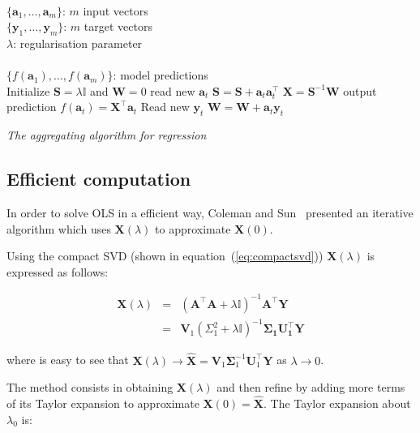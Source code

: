 \begin{algorithm}[ht]
\begin{algorithmic}[1]
\REQUIRE $\,$ \\
$\{\mathbf{a}_1,\dots,\mathbf{a}_{m} \}$: $m$ input vectors \\
$\{\mathbf{y}_1,\dots,\mathbf{y}_{m} \}$: $m$ target vectors \\
$\lambda$: regularisation parameter \\
\ENSURE  $\,$ \\
$\{f(\mathbf{a}_1),\dots,f(\mathbf{a}_{m}) \}$: model predictions \\
\STATE Initialize $\mathbf{S}=\lambda \mathbb{I}$
and $\mathbf{W}=0$
	\STATE read new $\mathbf{a}_t$
   	\STATE $\mathbf{S} = \mathbf{S} + \mathbf{a}_t \mathbf{a}_t^\intercal$
	\STATE $\mathbf{X}=\mathbf{S}^{-1}\mathbf{W}$
	\STATE output prediction $f(\mathbf{a}_t) = \mathbf{X}^\intercal \mathbf{a}_t$
   	\STATE Read new $\mathbf{y}_t$
    	\STATE $\mathbf{W} = \mathbf{W} + \mathbf{a}_t \mathbf{y}_t$
\ENDFOR
\end{algorithmic}
\caption{{\em The aggregating algorithm for regression}}
\label{alg:AAR}
\end{algorithm}


\subsection{Efficient computation}

In order to solve OLS in a efficient way, Coleman and
Sun~\cite{coleman+sun2010} presented an iterative algorithm which
uses $\mathbf{X}(\lambda)$ to approximate $\mathbf{X}(0)$.


Using the compact SVD (shown in equation~(\ref{eq:compactsvd}))
$\mathbf{X}(\lambda)$ is expressed as follows:


\begin{eqnarray}
\label{eq:optsolRRsvd}
\mathbf{X}(\lambda) & = & (\mathbf{A}^\top \mathbf{A}+ \lambda
\mathbb{I})^{-1}\mathbf{A}^\top \mathbf{Y} \nonumber \\
& = &\mathbf{V}_1(\Sigma_1^2+\lambda \mathbb{I})^{-1}\mathbf{\Sigma_1
U_1^\top Y}
\end{eqnarray}

\noindent where is easy to see that $\mathbf{X}(\lambda) \rightarrow
\mathbf{\hat{X}}=\mathbf{V}_1 \mathbf{\Sigma}_1^{-1}\mathbf{U}_1^\top
\mathbf{Y}$ as $\lambda \rightarrow 0$. 

The method consists in obtaining $\mathbf{X}(\lambda)$ and then refine
by adding more terms of its Taylor expansion to approximate
$\mathbf{X}(0) = \mathbf{\hat{X}}$. The Taylor expansion about $\lambda_0$ is:

